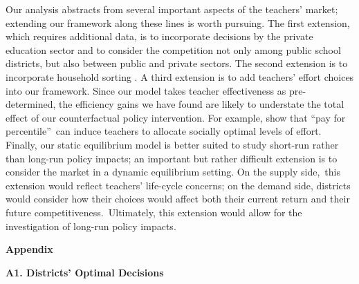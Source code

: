 \documentclass[notitlepage,12pt]{article}%
\begin{document}
Our analysis abstracts from several important aspects of the teachers' market;
extending our framework along these lines is worth pursuing. The first
extension, which requires additional data, is to incorporate decisions by the
private education sector and to consider the competition not only among public
school districts, but also between public and private sectors. The second
extension is to incorporate household sorting
\citep[e.g.,][]{epple1999estimating,epple2003neighborhood,ferreyra2007estimating,epple2008school}.
A third extension is to add teachers' effort choices into our framework. Since
our model takes teacher effectiveness as pre-determined, the efficiency gains
we have found are likely to understate the total effect of our counterfactual
policy intervention. For example, \citet{barlevy2012pay} show that
\textquotedblleft pay for percentile\textquotedblright\ can induce teachers to
allocate socially optimal levels of effort. Finally, our static equilibrium
model is better suited to study short-run rather than long-run policy impacts;
an important but rather difficult extension is to consider the market in a
dynamic equilibrium setting. On the supply side,\ this extension would reflect
teachers' life-cycle concerns; on the demand side, districts would consider
how their choices would affect both their current return and their future
competitiveness.\ Ultimately, this extension would allow for the investigation
of long-run policy impacts.

\singlespacing







\begin{center}
\textbf{{\Large Appendix}}\bigskip
\end{center}

\setcounter{table}{0} \setcounter{figure}{0} \setcounter{section}{0}
\renewcommand{\thesection}{A\arabic{section}}
\renewcommand{\thetable}{A\MakeUppercase{\arabic{table}}} \renewcommand{\thefigure}{A\MakeUppercase{\arabic{figure}}}

\textbf{A1. Districts' Optimal Decisions}
\end{document}
